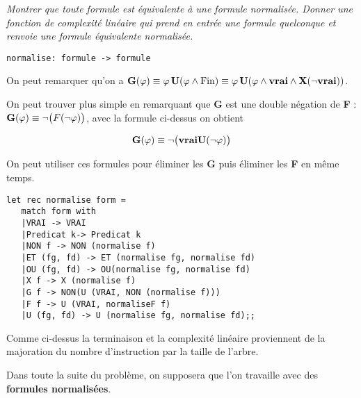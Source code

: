 \begin{Exercise}\it
Montrer que toute formule est équivalente à une formule normalisée. Donner une fonction  de complexité linéaire qui prend en entrée une formule quelconque et renvoie une formule équivalente normalisée.
\begin{lstlisting}
normalise: formule -> formule
\end{lstlisting}
\end{Exercise}
\begin{Answer}

On peut remarquer qu'on a ${\bf G}(\varphi) \equiv \varphi\, {\bf U} (\varphi \wedge \text{Fin}) \equiv  
\varphi\, {\bf U} (\varphi \wedge {\bf vrai} \wedge {\bf X}(\neg {\bf vrai}))$.

On peut trouver plus simple en remarquant que {\bf G} est une double négation de {\bf F} :
${\bf G}(\varphi) \equiv \neg\bigl(F(\neg \varphi)\bigr)$, avec la formule ci-dessus on obtient

\[{\bf G}(\varphi) \equiv \neg\bigl( {\bf vrai} {\bf U}(\neg \varphi)\bigr)\]

On peut utiliser ces formules pour éliminer les {\bf G} puis éliminer les {\bf F} en même temps.

\begin{lstlisting}
let rec normalise form = 
   match form with 
   |VRAI -> VRAI
   |Predicat k-> Predicat k
   |NON f -> NON (normalise f)
   |ET (fg, fd) -> ET (normalise fg, normalise fd)
   |OU (fg, fd) -> OU(normalise fg, normalise fd)
   |X f -> X (normalise f)
   |G f -> NON(U (VRAI, NON (normalise f)))
   |F f -> U (VRAI, normaliseF f)
   |U (fg, fd) -> U (normalise fg, normalise fd);;
\end{lstlisting} 

Comme ci-dessus la terminaison et la complexité linéaire proviennent de la majoration du nombre d'instruction par la taille de l'arbre.
\end{Answer}
Dans toute la suite du problème, on supposera que l'on travaille avec des {\bf formules normalisées}.

